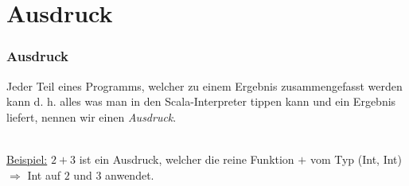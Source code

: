 	\section[Section]{Ausdruck}
		\begin{frame}
			\frametitle{Ausdruck}
			\begin{definition}[Ausdruck]
				Jeder Teil eines Programms, welcher zu einem Ergebnis 								zusammengefasst werden kann d. h. alles was man in den 
				Scala-Interpreter tippen kann und ein Ergebnis liefert,
				nennen wir einen \emph{Ausdruck}.
		\end{definition} 
		\leavevmode \\
		\underline{Beispiel:} $2+3$ ist ein Ausdruck, welcher die reine Funktion
		$+$  vom Typ (Int, Int) $\Rightarrow$ Int auf $2$ und $3$ anwendet.
		\end{frame}